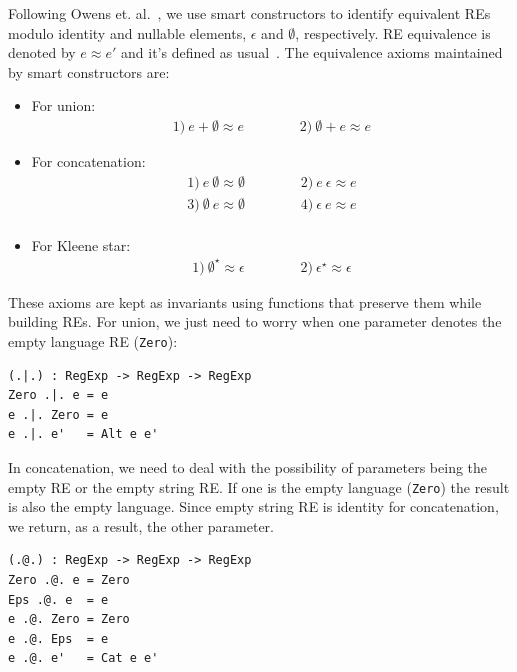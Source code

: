 \documentclass{llncs}
\newcommand{\idris}[1]{\texttt{#1}}%
\begin{document}
Following Owens et. al.~\cite{Owens2009}, we use smart constructors to
identify equivalent REs modulo identity and nullable
elements, $\epsilon$ and $\emptyset$, respectively. RE equivalence is
denoted by $e \approx e'$ and it's defined as usual~\cite{Hopcroft2000}.  The equivalence
axioms maintained by smart constructors are:
\begin{itemize}
    \item For union:
      \[
          \begin{array}{ccc}
              1)\: e + \emptyset \approx e &\hspace{1cm} & 2)\: \emptyset + e \approx e
          \end{array}
      \]
      \item For concatenation:
      \[
          \begin{array}{ccc}
              1)\: e\:\emptyset \approx \emptyset & \hspace{1cm} & 2)\: e\:\epsilon \approx e\\
              3)\: \emptyset\:e\approx \emptyset & & 4)\: \epsilon\: e \approx e\\
          \end{array}
      \]
      \item For Kleene star:
      \[
           \begin{array}{ccc}
               1)\: \emptyset^\star \approx \epsilon & \hspace{1cm} & 2)\: \epsilon^\star
                                                  \approx \epsilon
           \end{array}
      \]
\end{itemize}
These axioms are kept as invariants using functions that preserve them
while building REs. For union, we just need to worry when one
parameter denotes the empty language RE (\idris{Zero}):
\begin{verbatim}
(.|.) : RegExp -> RegExp -> RegExp
Zero .|. e = e
e .|. Zero = e
e .|. e'   = Alt e e'
\end{verbatim}
In concatenation, we need to deal with the possibility of
parameters being the empty RE or the empty string RE. If one is the
empty language (\idris{Zero}) the result is also the empty
language. Since empty string RE is identity for concatenation, we
return, as a result, the other parameter.
\begin{verbatim}
(.@.) : RegExp -> RegExp -> RegExp
Zero .@. e = Zero
Eps .@. e  = e
e .@. Zero = Zero
e .@. Eps  = e
e .@. e'   = Cat e e'
\end{verbatim}
\end{document}
